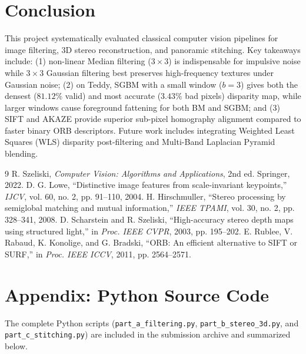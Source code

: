 \documentclass[a4paper,12pt]{article}
\begin{document}
\section{Conclusion}
This project systematically evaluated classical computer vision pipelines for image filtering, 3D stereo reconstruction, and panoramic stitching. Key takeaways include: (1) non-linear Median filtering ($3\times 3$) is indispensable for impulsive noise while $3\times 3$ Gaussian filtering best preserves high-frequency textures under Gaussian noise; (2) on Teddy, SGBM with a small window ($b=3$) gives both the densest ($81.12\%$ valid) and most accurate ($3.43\%$ bad pixels) disparity map, while larger windows cause foreground fattening for both BM and SGBM; and (3) SIFT and AKAZE provide superior sub-pixel homography alignment compared to faster binary ORB descriptors. Future work includes integrating Weighted Least Squares (WLS) disparity post-filtering and Multi-Band Laplacian Pyramid blending.

\begin{thebibliography}{9}
 R. Szeliski, \textit{Computer Vision: Algorithms and Applications}, 2nd ed. Springer, 2022.
 D. G. Lowe, ``Distinctive image features from scale-invariant keypoints,'' \textit{IJCV}, vol. 60, no. 2, pp. 91--110, 2004.
 H. Hirschmuller, ``Stereo processing by semiglobal matching and mutual information,'' \textit{IEEE TPAMI}, vol. 30, no. 2, pp. 328--341, 2008.
 D. Scharstein and R. Szeliski, ``High-accuracy stereo depth maps using structured light,'' in \textit{Proc. IEEE CVPR}, 2003, pp. 195--202.
 E. Rublee, V. Rabaud, K. Konolige, and G. Bradski, ``ORB: An efficient alternative to SIFT or SURF,'' in \textit{Proc. IEEE ICCV}, 2011, pp. 2564--2571.
\end{thebibliography}

\appendix
\section{Appendix: Python Source Code}
The complete Python scripts (\texttt{part\_a\_filtering.py}, \texttt{part\_b\_stereo\_3d.py}, and \texttt{part\_c\_stitching.py}) are included in the submission archive and summarized below.



\end{document}

